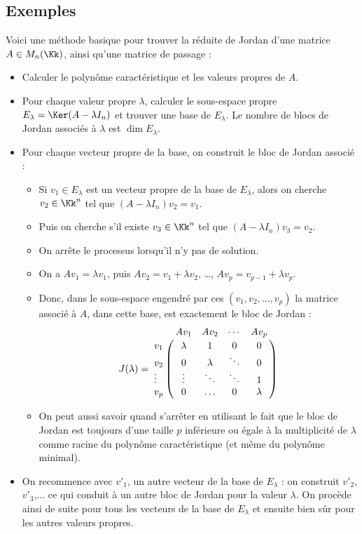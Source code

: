 \documentclass[12pt, class=report,crop=false]{standalone}
\begin{document}
\subsection{Exemples}

Voici une méthode basique pour trouver la réduite de Jordan d'une matrice $A \in M_n(\Kk)$, 
ainsi qu'une matrice de passage :

\begin{itemize}
  \item Calculer le polynôme caractéristique et les valeurs propres de $A$.
  
  \item Pour chaque valeur propre $\lambda$, calculer le sous-espace propre
  $E_\lambda = \Ker(A-\lambda I_n)$ et trouver une base de $E_\lambda$.
  Le nombre de blocs de Jordan associés à $\lambda$ est $\dim E_\lambda$.
    
  \item Pour chaque vecteur propre de la base, on construit le bloc de Jordan associé :
  \begin{itemize}
      \item Si $v_1 \in E_\lambda$ est un vecteur propre de la base de $E_\lambda$, alors on cherche
  $v_2 \in \Kk^n$ tel que $(A-\lambda I_n)v_2 = v_1$. 
      \item Puis on cherche s'il existe
  $v_3 \in \Kk^n$ tel que $(A-\lambda I_n)v_3 = v_2$.
      \item On arrête le processus lorsqu'il n'y pas de solution. 
      \item On a $Av_1 = \lambda v_1$, puis $Av_2 = v_1 + \lambda v_2$, \ldots,
  $Av_p = v_{p-1} + \lambda v_p$. 
      \item Donc, dans le sous-espace engendré par ces $(v_1,v_2,\ldots,v_p)$ la matrice associé à $A$, dans cette base, est exactement le bloc de Jordan :
  $$J(\lambda) = 
  \bordermatrix{
     & Av_1    & Av_2 & \cdots & Av_p \cr
  v_1& \lambda&1&0&0 \cr
  v_2& 0&\lambda&\ddots&0\cr
   \vdots  & \vdots&\ddots&\ddots&1 \cr
  v_p& 0&\ldots&0&\lambda }
  $$ 
  
      \item On peut aussi savoir quand s'arrêter en utilisant le fait que le bloc de Jordan est toujours d'une taille $p$ inférieure ou égale à la multiplicité de $\lambda$
  comme racine du polynôme caractéristique (et même du polynôme minimal).
  \end{itemize}
  
  
  \item On recommence avec $v'_1$, un autre vecteur de la base de $E_\lambda$ : on construit $v'_2$, $v'_3$,... ce qui conduit à un autre bloc de Jordan pour la valeur $\lambda$. On procède ainsi de suite pour tous les vecteurs de la base de $E_\lambda$ et ensuite bien sûr pour les autres valeurs propres. 
\end{itemize}  
 
\end{document}
